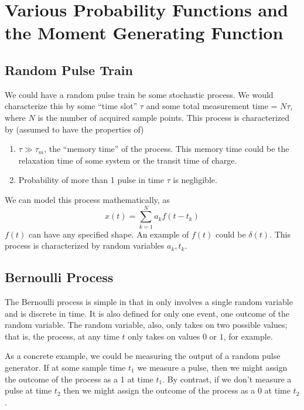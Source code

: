 \documentclass{article}
\begin{document}
\section{Various Probability Functions and the Moment Generating Function}
\subsection{Random Pulse Train}
We could have a random pulse train be some stochastic process. We would
characterize this by some ``time slot'' $ \tau $ and some total measurement time
= $ N \tau $, where $ N $ is the number of acquired sample points. This process
is characterized by (assumed to have the properties of)
\begin{enumerate}
   \item $\tau \gg \tau_{m} $, the ``memory time'' of the process.
This memory time could be the relaxation time of some system or the transit time
of charge.
\item Probability of more than 1 pulse in time $ \tau $ is negligible.
\end{enumerate}
We can model this process mathematically, as
\[
   x(t) = \sum^{N}_{k=1} a_{k}f(t-t_{k})
\]
$ f(t) $ can have any specified shape. An example of $ f(t) $ could be $
\delta(t) $. This process is characterized by random variables $ a_{k}, t_{k} $.

\subsection{Bernoulli Process}

The Bernoulli process is simple in that in only involves a single random
variable and is discrete in time. It is also defined for only one event, one
outcome of the random variable. The random variable, also, only takes on two
possible values; that is, the process, at any time $ t $ only takes on values $
0 $ or $ 1 $, for example.

As a concrete example, we could be measuring the output of a random pulse
generator. If at some sample time $ t_{1} $ we measure a pulse, then we might
assign the outcome of the process as a 1 at time $ t_{1} $. By contrast, if we
don't measure a pulse at time $ t_{2} $ then we might assign the outcome of the
process as a 0 at time $ t_{2} $.
\end{document}
